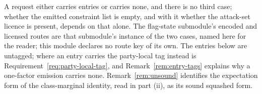 
A request either carries entries or carries none, and there is no third
case; whether the emitted constraint list is empty, and with it whether the
attack-set licence is present, depends on that alone. The flag-state
submodule's encoded and licensed routes are that submodule's instance of the
two cases, named here for the reader; this module declares no route key of
its own. The entries below are untagged; where an entry carries the
party-local tag instead is Requirement~\ref{req:party-local-tag}, and
Remark~\ref{rem:entry-tags} explains why a one-factor emission carries none.
Remark~\ref{rem:unsound} identifies the expectation form of the
class-marginal identity, read in part (ii), as its sound squashed form.

